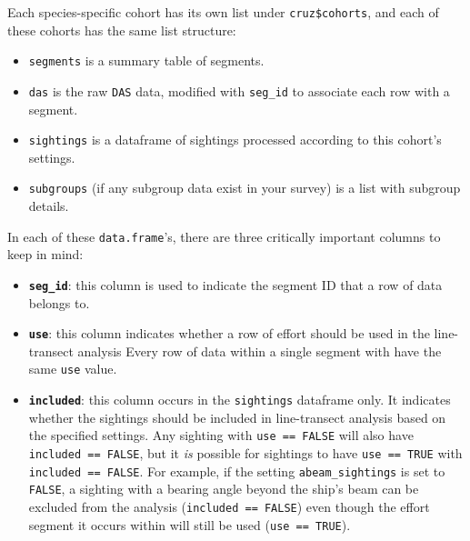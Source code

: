 \documentclass[
]{book}
\newenvironment{Shaded}{\begin{snugshade}}{\end{snugshade}}
\newcommand{\DataTypeTok}[1]{\textcolor[rgb]{0.13,0.29,0.53}{#1}}
\newcommand{\DecValTok}[1]{\textcolor[rgb]{0.00,0.00,0.81}{#1}}
\newcommand{\FloatTok}[1]{\textcolor[rgb]{0.00,0.00,0.81}{#1}}
\newcommand{\KeywordTok}[1]{\textcolor[rgb]{0.13,0.29,0.53}{\textbf{#1}}}
\newcommand{\NormalTok}[1]{#1}
\newcommand{\OperatorTok}[1]{\textcolor[rgb]{0.81,0.36,0.00}{\textbf{#1}}}
\newcommand{\StringTok}[1]{\textcolor[rgb]{0.31,0.60,0.02}{#1}}
\begin{document}
\begin{Shaded}
\end{Shaded}

Each species-specific cohort has its own list under \texttt{cruz\$cohorts}, and each of these cohorts has the same list structure:

\begin{itemize}
\item
  \texttt{segments} is a summary table of segments.
\item
  \texttt{das} is the raw \texttt{DAS} data, modified with \texttt{seg\_id} to associate each row with a segment.
\item
  \texttt{sightings} is a dataframe of sightings processed according to this cohort's settings.
\item
  \texttt{subgroups} (if any subgroup data exist in your survey) is a list with subgroup details.
\end{itemize}

In each of these \texttt{data.frame}'s, there are three critically important columns to keep in mind:

\begin{itemize}
\item
  \textbf{\texttt{seg\_id}}: this column is used to indicate the segment ID that a row of data belongs to.
\item
  \textbf{\texttt{use}}: this column indicates whether a row of effort should be used in the line-transect analysis Every row of data within a single segment with have the same \texttt{use} value.
\item
  \textbf{\texttt{included}}: this column occurs in the \texttt{sightings} dataframe only. It indicates whether the sightings should be included in line-transect analysis based on the specified settings. Any sighting with \texttt{use\ ==\ FALSE} will also have \texttt{included\ ==\ FALSE}, but it \emph{is} possible for sightings to have \texttt{use\ ==\ TRUE} with \texttt{included\ ==\ FALSE}. For example, if the setting \texttt{abeam\_sightings} is set to \texttt{FALSE}, a sighting with a bearing angle beyond the ship's beam can be excluded from the analysis (\texttt{included\ ==\ FALSE}) even though the effort segment it occurs within will still be used (\texttt{use\ ==\ TRUE}).
\end{itemize}
\end{document}
